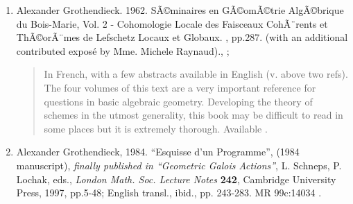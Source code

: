 \documentclass[12pt]{article}
\begin{document}
\begin{enumerate}
\item Alexander Grothendieck. 1962. SÃ©minaires en GÃ©omÃ©trie AlgÃ©brique du Bois-Marie, Vol. 2 - Cohomologie Locale des Faisceaux CohÃ¨rents et ThÃ©orÃ¨mes de Lefschetz Locaux et Globaux. , pp.287. (with an additional contributed expos\'e by Mme. Michele Raynaud)., 
;


\begin{quote} 
In French, with a few abstracts available in English (v. above two refs).  The four volumes of this text are a very important reference for questions in basic algebraic geometry. Developing the theory of schemes in the utmost generality, this book may be difficult to read in some places but it is extremely thorough.  Available .
\end{quote}

\item Alexander Grothendieck, 1984. ``Esquisse d'un Programme'', (1984 manuscript), 
{\em finally published in ``Geometric Galois Actions''}, L. Schneps, P. Lochak, eds., 
{\em London Math. Soc. Lecture Notes} {\bf 242}, Cambridge University Press, 1997, pp.5-48;
English transl., ibid., pp. 243-283. MR 99c:14034 .


\end{enumerate}
\end{document}
